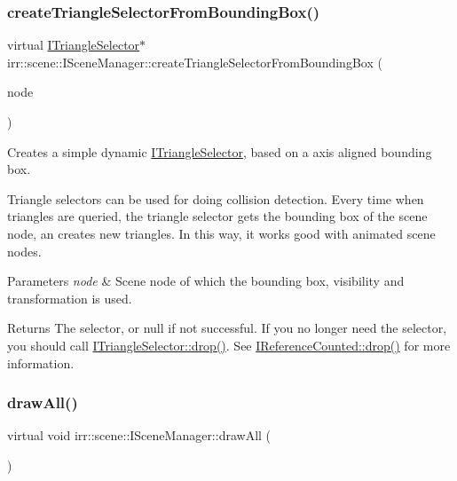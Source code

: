 \subsubsection{\texorpdfstring{create\+Triangle\+Selector\+From\+Bounding\+Box()}{createTriangleSelectorFromBoundingBox()}\hspace{0.1cm}{\footnotesize\ttfamily [2/2]}}
{\footnotesize\ttfamily virtual \hyperlink{classirr_1_1scene_1_1ITriangleSelector}{I\+Triangle\+Selector}$\ast$ irr\+::scene\+::\+I\+Scene\+Manager\+::create\+Triangle\+Selector\+From\+Bounding\+Box (\begin{DoxyParamCaption}\item[{\hyperlink{classirr_1_1scene_1_1ISceneNode}{I\+Scene\+Node} $\ast$}]{node }\end{DoxyParamCaption})\hspace{0.3cm}{\ttfamily [pure virtual]}}



Creates a simple dynamic \hyperlink{classirr_1_1scene_1_1ITriangleSelector}{I\+Triangle\+Selector}, based on a axis aligned bounding box. 

Triangle selectors can be used for doing collision detection. Every time when triangles are queried, the triangle selector gets the bounding box of the scene node, an creates new triangles. In this way, it works good with animated scene nodes. 
\begin{DoxyParams}{Parameters}
{\em node} & Scene node of which the bounding box, visibility and transformation is used. \\
\hline
\end{DoxyParams}
\begin{DoxyReturn}{Returns}
The selector, or null if not successful. If you no longer need the selector, you should call \hyperlink{classirr_1_1IReferenceCounted_a03856a09355b89d178090c4a5f738543}{I\+Triangle\+Selector\+::drop()}. See \hyperlink{classirr_1_1IReferenceCounted_a03856a09355b89d178090c4a5f738543}{I\+Reference\+Counted\+::drop()} for more information. 
\end{DoxyReturn}
\mbox{\label{classirr_1_1scene_1_1ISceneManager_a04240262904667c821bd9de5e5fd9b02}} 
\subsubsection{\texorpdfstring{draw\+All()}{drawAll()}\hspace{0.1cm}{\footnotesize\ttfamily [1/2]}}
{\footnotesize\ttfamily virtual void irr\+::scene\+::\+I\+Scene\+Manager\+::draw\+All (\begin{DoxyParamCaption}{ }\end{DoxyParamCaption})\hspace{0.3cm}{\ttfamily [pure virtual]}}



